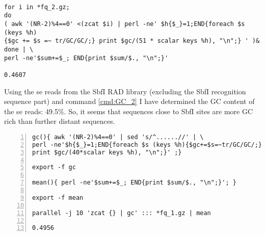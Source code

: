\documentclass[a4paper,12pt,times,authoryear,twoside,print,index]{Classes/PhDThesisPSnPDF}\usepackage[]{graphicx}\usepackage[]{color}
\begin{document}
%
\begin{cmd}
\captionsetup{type=cmd} %
\begin{Verbatim}[formatcom=\color{darkgray}, fontsize=\scriptsize]

for i in *fq_2.gz; 
do 
( awk '(NR-2)%4==0' <(zcat $i) | perl -ne' $h{$_}=1;END{foreach $s (keys %h)
{$gc += $s =~ tr/GC/GC/;} print $gc/(51 * scalar keys %h), "\n";} ' )& 
done | \
perl -ne'$sum+=$_; END{print $sum/$., "\n";}'

0.4607
\end{Verbatim}
\caption[Determine GC content from standard RAD PE reads]{\small For each individual, this command takes the \glspl{pe} reads, uniques them and determines their overall GC content. Finally, the average of the individual GC contents is taken. Note the brute-force parallelisation by sending each iteration of the \texttt{for} loop into the background with \texttt{(\ldots )\&}.}
\label{cmd:GC_1}
\end{cmd}
%
Using the \gls{se} reads from the \gls{SbfI} RAD library (excluding the SbfI recognition sequence part) and command \ref{cmd:GC_2} I have determined the GC content of the \gls{se} reads: 49.5\%. So, it seems that sequences close to \gls{SbfI} sites are more GC rich than further distant sequences. 
%
\begin{cmd}
\captionsetup{type=cmd} %
\begin{Verbatim}[formatcom=\color{darkgray}, fontsize=\scriptsize, numbers=left]
gc(){ awk '(NR-2)%4==0' | sed 's/^......//' | \
perl -ne'$h{$_}=1;END{foreach $s (keys %h){$gc+=$s=~tr/GC/GC/;} 
print $gc/(40*scalar keys %h), "\n";}' ;}

export -f gc

mean(){ perl -ne'$sum+=$_; END{print $sum/$., "\n";}'; }

export -f mean

parallel -j 10 'zcat {} | gc' ::: *fq_1.gz | mean

0.4956
\end{Verbatim}
\caption[Determine GC content of \gls{se} reads]{\small This command is a different version of command \ref{cmd:GC_1}. It is used here to determine the GC content of all \gls{se} reads from the standard \gls{SbfI} RAD library. It first creates and exports two functions, \texttt{gc} and \texttt{mean}, and then uses the programme \texttt{parallel} in order to parallelise the determination of GC content over 10 cores. After stripping barcode and the remainder of the restriction site, the reads are 40 base pairs long. Note, the space between \{ and \texttt{awk} (line 1) as well as \{ and \texttt{perl} (line 7) is required.}
\label{cmd:GC_2}
\end{cmd}
\end{document}
